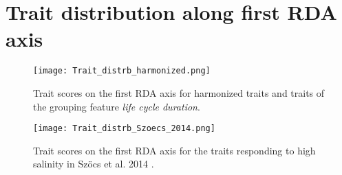 \documentclass[../Draft_harmonization_paper.tex]{subfiles}
\begin{document}
\section*{Trait distribution along first RDA axis} 
\begin{figure}[H]
    \centering
    \texttt{[image: Trait\_distrb\_harmonized.png]}
    \caption{Trait scores on the first RDA axis for harmonized traits and traits of the grouping feature \textit{life cycle duration}.
    } 
\end{figure}

\begin{figure}[H]
    \centering
    \texttt{[image: Trait\_distrb\_Szoecs\_2014.png]}
    \caption{Trait scores on the first RDA axis for the traits responding to high salinity in Szöcs et al. 2014
    .
    }
\end{figure}

\newpage
\end{document}
